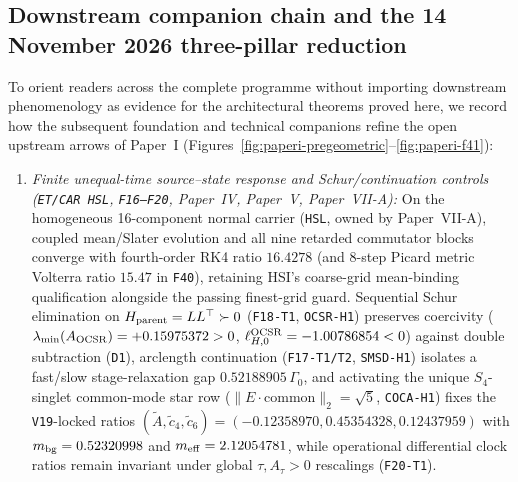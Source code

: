 \documentclass[11pt]{article}
\begin{document}
\subsection{Downstream companion chain and the 14 November 2026 three-pillar reduction}
\label{sec:etcar-chain-20261110}
\label{sec:foundations-f16-f20-20261112}\hypertarget{f16f20paperi}{}
To orient readers across the complete programme without importing downstream phenomenology as evidence for the architectural theorems proved here, we record how the subsequent foundation and technical companions refine the open upstream arrows of Paper~I (Figures~\ref{fig:paperi-pregeometric}--\ref{fig:paperi-f41}):
\begin{enumerate}
\item \emph{Finite unequal-time source--state response and Schur/continuation controls (\texttt{ET/CAR HSL}, \texttt{F16--F20}, Paper~IV, Paper~V, Paper~VII-A):} On the homogeneous 16-component normal carrier (\texttt{HSL}, owned by Paper~VII-A), coupled mean/Slater evolution and all nine retarded commutator blocks converge with fourth-order RK4 ratio $16.4278$ (and $8$-step Picard metric Volterra ratio $15.47$ in \texttt{F40}), retaining HSI's coarse-grid mean-binding qualification alongside the passing finest-grid guard. Sequential Schur elimination on $H_{\rm parent}=LL^\top\succ 0$ (\texttt{F18-T1}, \texttt{OCSR-H1}) preserves coercivity ($\lambda_{\min}(A_{\rm OCSR})=+0.15975372>0$, $\ell_{H,0}^{\rm OCSR}=-1.00786854<0$) against double subtraction (\texttt{D1}), arclength continuation (\texttt{F17-T1/T2}, \texttt{SMSD-H1}) isolates a fast/slow stage-relaxation gap $0.52188905\,\Gamma_0$, and activating the unique $S_4$-singlet common-mode star row ($\|E\cdot\text{common}\|_2=\sqrt{5}$, \texttt{COCA-H1}) fixes the \texttt{V19}-locked ratios $(\tilde A,\tilde c_4,\tilde c_6)=(-0.12358970,0.45354328,0.12437959)$ with $m_{\rm bg}=0.52320998$ and $m_{\rm eff}=2.12054781$, while operational differential clock ratios remain invariant under global $\tau,A_\tau>0$ rescalings (\texttt{F20-T1}).

\end{enumerate}
\end{document}
